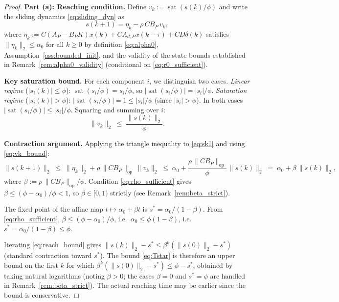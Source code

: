 \documentclass[10pt]{amsart}
\DeclareMathOperator{\sat}{sat}
\numberwithin{equation}{section}
\begin{document}
\begin{proof}
\textbf{Part (a): Reaching condition.}
Define $v_k := \sat(s(k)/\phi)$ and write the sliding dynamics \eqref{eq:sliding_dyn} as
\begin{equation}\label{eq:sk1}
s(k+1) = \eta_k - \rho\, CB_P\, v_k,
\end{equation}
where $\eta_k := C(A_P-B_PK)x(k) + CA_{d,P}x(k-\tau) + CD\delta(k)$ satisfies
$\|\eta_k\|_2 \leq \alpha_0$ for all $k \geq 0$ by definition \eqref{eq:alpha0},
Assumption~\ref{ass:bounded_init}, and the validity of the state bounds established in
Remark~\ref{rem:alpha0_validity} (conditional on \eqref{eq:r0_sufficient}).

\textbf{Key saturation bound.}
For each component $i$, we distinguish two cases. \emph{Linear regime}
($|s_i(k)| \leq \phi$): $\sat(s_i/\phi) = s_i/\phi$, so
$|\sat(s_i/\phi)| = |s_i|/\phi$. \emph{Saturation regime} ($|s_i(k)| > \phi$):
$|\sat(s_i/\phi)| = 1 \leq |s_i|/\phi$ (since $|s_i| > \phi$). In both cases
$|\sat(s_i/\phi)| \leq |s_i|/\phi$. Squaring and summing over $i$:
\begin{equation}\label{eq:vk_bound}
  \|v_k\|_2 \;\leq\; \frac{\|s(k)\|_2}{\phi}.
\end{equation}

\textbf{Contraction argument.}
Applying the triangle inequality to \eqref{eq:sk1} and using \eqref{eq:vk_bound}:
\begin{equation}\label{eq:reach_bound}
  \|s(k+1)\|_2
  \;\leq\; \|\eta_k\|_2 + \rho\,\|CB_P\|_{\mathrm{op}}\,\|v_k\|_2
  \;\leq\; \alpha_0 + \frac{\rho\,\|CB_P\|_{\mathrm{op}}}{\phi}\,\|s(k)\|_2
  \;=\; \alpha_0 + \beta\,\|s(k)\|_2,
\end{equation}
where $\beta := \rho\,\|CB_P\|_{\mathrm{op}}/\phi$. Condition \eqref{eq:rho_sufficient}
gives $\beta \leq (\phi - \alpha_0)/\phi < 1$, so $\beta \in [0,1)$ strictly (see
Remark~\ref{rem:beta_strict}).

The fixed point of the affine map $t \mapsto \alpha_0 + \beta t$ is
$s^* = \alpha_0/(1-\beta)$. From \eqref{eq:rho_sufficient},
$\beta \leq (\phi-\alpha_0)/\phi$, i.e.\ $\alpha_0 \leq \phi(1-\beta)$, i.e.\
$s^* = \alpha_0/(1-\beta) \leq \phi$.

Iterating \eqref{eq:reach_bound} gives
$\|s(k)\|_2 - s^* \leq \beta^k(\|s(0)\|_2 - s^*)$
(standard contraction toward $s^*$). The bound \eqref{eq:Tstar} is therefore an upper
bound on the first $k$ for which
$\beta^k(\|s(0)\|_2 - s^*) \leq \phi - s^*$, obtained by taking natural logarithms
(noting $\beta > 0$; the cases $\beta=0$ and $s^*=\phi$ are handled in
Remark~\ref{rem:beta_strict}). The actual reaching time may be earlier since the bound
is conservative.


\end{proof}
\end{document}

